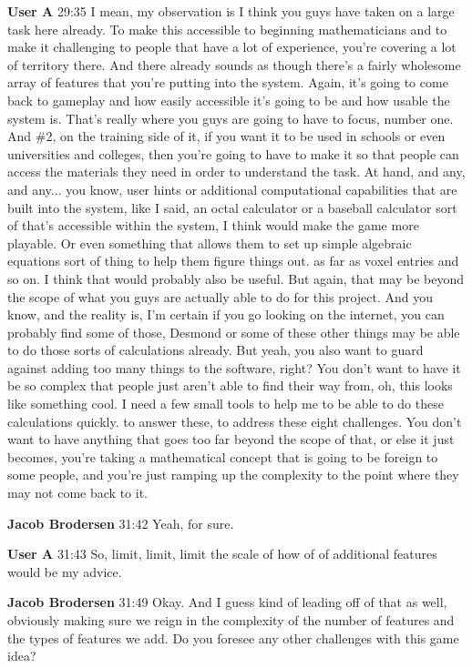 \documentclass{article}
\begin{document}
\noindent \textbf{User A}   29:35
I mean, my observation is I think you guys have taken on a large task here already. To make this accessible to beginning mathematicians and to make it challenging to people that have a lot of experience, you're covering a lot of territory there. And there already sounds as though there's a fairly wholesome array of features that you're putting into the system. Again, it's going to come back
to gameplay and how easily accessible it's going to be and how usable the system is. That's really where you guys are going to have to focus, number one. And \#2, on the training side of it, if you want it to be used in schools or even universities and colleges, then you're going to have to make it so that people can access the materials they need in order to understand the task.
At hand, and any, and any...
you know, user hints or additional computational capabilities that are built into the system, like I said, an octal calculator or a baseball calculator sort of that's accessible within the system, I think would make the game more playable. Or even something that allows them to set up simple algebraic equations sort of thing to help them figure things out.
as far as voxel entries and so on. I think that would probably also be useful. But again, that may be beyond the scope of what you guys are actually able to do for this project. And you know, and the reality is, I'm certain if you go looking on the internet, you can probably find some of those, Desmond or some of these other things may be able to do those sorts of
calculations already. But yeah, you also want to guard against adding too many things to the software, right? You don't want to have it be so complex that people just aren't able to find their way from, oh, this looks like something cool. I need a few small tools to help me to be able to do these calculations quickly.
to answer these, to address these eight challenges. You don't want to have anything that goes too far beyond the scope of that, or else it just becomes, you're taking a mathematical concept that is going to be foreign to some people, and you're just ramping up the complexity to the point where they may not come back to it.

\noindent \textbf{Jacob Brodersen}   31:42
Yeah, for sure.

\noindent \textbf{User A}   31:43
So, limit, limit, limit the scale of how of of additional features would be my advice.

\noindent \textbf{Jacob Brodersen}   31:49
Okay.
And I guess kind of leading off of that as well, obviously making sure we reign in the complexity of the number of features and the types of features we add. Do you foresee any other challenges with this game idea?
\end{document}
